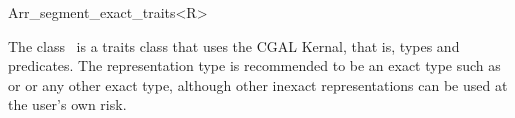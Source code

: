 
\ccRefPageBegin


\begin{ccRefClass}{Arr_segment_exact_traits<R>}

\ccDefinition
   The class \ccRefName\ is
   a traits class that uses the CGAL Kernal, that is, types and predicates.
   The representation type  is recommended to be an
   exact type such as  or
    or any other
   exact type, although other inexact representations can be used at
   the user's own risk.


\ccIsModel
     


\end{ccRefClass} %




\ccRefPageEnd
